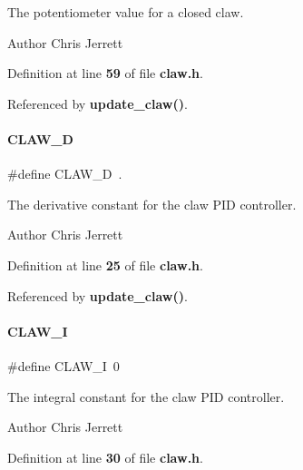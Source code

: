 The potentiometer value for a closed claw. 

\begin{DoxyAuthor}{Author}
Chris Jerrett 
\end{DoxyAuthor}


Definition at line \textbf{ 59} of file \textbf{ claw.\+h}.



Referenced by \textbf{ update\+\_\+claw()}.

\mbox{\label{claw_8h_afa5b4892ddbbfd14068e08422386bc3f}} 
\paragraph{C\+L\+A\+W\+\_\+D}
{\footnotesize\ttfamily \#define C\+L\+A\+W\+\_\+D~.}



The derivative constant for the claw P\+ID controller. 

\begin{DoxyAuthor}{Author}
Chris Jerrett 
\end{DoxyAuthor}


Definition at line \textbf{ 25} of file \textbf{ claw.\+h}.



Referenced by \textbf{ update\+\_\+claw()}.

\mbox{\label{claw_8h_a012d8ac544ee8a7a6413cee1b456773c}} 
\paragraph{C\+L\+A\+W\+\_\+I}
{\footnotesize\ttfamily \#define C\+L\+A\+W\+\_\+I~0}



The integral constant for the claw P\+ID controller. 

\begin{DoxyAuthor}{Author}
Chris Jerrett 
\end{DoxyAuthor}


Definition at line \textbf{ 30} of file \textbf{ claw.\+h}.

\mbox{\label{claw_8h_ae42993ee3f6f4a0e47f99060fe736ba0}} 
